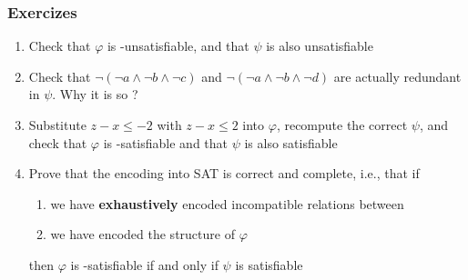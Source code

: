\begin{frame}
  \frametitle{Exercizes}

  \begin{enumerate}
    \item Check that $\varphi$ is \Lia-unsatisfiable, and that $\psi$ is also unsatisfiable

    \vfill

    \item Check that 
	  $\neg( \neg a \wedge \neg b \wedge \neg c )$ and $\neg( \neg a \wedge \neg b \wedge \neg d )$
	  are actually redundant in $\psi$. Why it is so ?

    \vfill

    \item Substitute $z - x \leq -2$ with $z - x \leq 2$ into $\varphi$, recompute
	  the correct $\psi$, and check that $\varphi$ is \Lia-satisfiable and that
	  $\psi$ is also satisfiable

    \vfill

    \item Prove that the encoding into SAT is correct and complete, i.e., that if
    \begin{enumerate}[$(i)$]
      \item we have {\bf exhaustively} encoded incompatible relations between \tatoms 
      \item we have encoded the structure of $\varphi$
    \end{enumerate} 
	  then $\varphi$ is \T-satisfiable if and only if $\psi$ is satisfiable

  \end{enumerate}

\end{frame}
